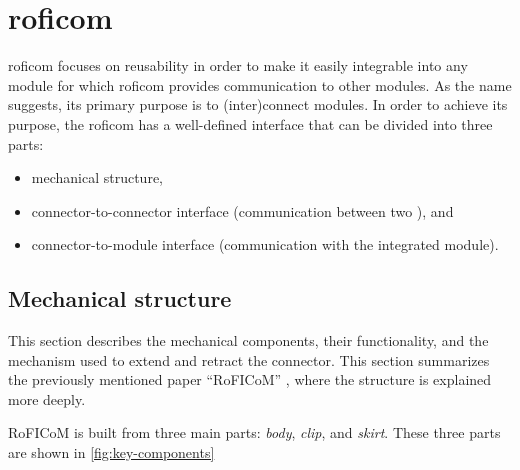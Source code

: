 \documentclass[
  digital,     %
  oneside,     %
  nosansbold,  %
  nocolorbold, %
  nolof,         %
  nolot,         %
]{fithesis4}
\newcommand{\TODO}[1]{#1} %
\newcommand{\TODOLIST}[1]{}
\begin{document}
\section[ RoFI Communication Mechanism ]{ \acrlong{roficom} } \label{sec:roficom}
\TODOLIST{
\begin{itemize}
    \item Explain \acrshort{roficom}
    \item Describe components --- shirt, clip and body
    \item Describe board --- RAM: 36KB, Flash: 128KB, ...
\end{itemize}
}

\acrshort{roficom} focuses on reusability in order to make it easily integrable into any module for
which \acrshort{roficom} provides communication to other modules. As the name suggests, its primary
purpose is to (inter)connect modules. In order to achieve its purpose, the \acrshort{roficom} has a
well-defined interface that can be divided into three parts:

\begin{itemize}
    \item mechanical structure,
    \item connector-to-connector interface (communication between two ), and
    \item connector-to-module interface (communication with the integrated module).
\end{itemize}

\subsection{Mechanical structure}

This section describes the mechanical components, their functionality, and the mechanism used to
extend and retract the connector. This section summarizes the previously mentioned paper ``RoFICoM''
\cite{MrazekBarnat2019Roficom}, where the structure is explained more deeply.

RoFICoM is built from three main parts: \emph{body}, \emph{clip}, and \emph{skirt}. These three
parts are shown in \autoref{fig:key-components}
\end{document}
